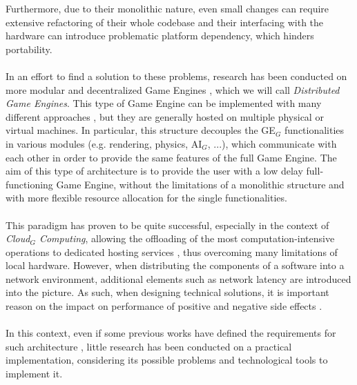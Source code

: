 Furthermore, due to their monolithic nature, even small changes can require extensive refactoring of their whole codebase and their interfacing with the hardware can introduce problematic platform dependency, which hinders portability. \\ \\
In an effort to find a solution to these problems, research has been conducted on more modular and decentralized Game Engines \cite{womak:distributed-architecture-interactive-multiplayer, womak:distributed-cloud-gaming-pipeline, womak:distributed-game-engine-android}, which we will call \textit{Distributed Game Engines}. This type of Game Engine can be implemented with many different approaches \cite{womak:revamping-cloud-games, womak:distributed-cloud-gaming-pipeline, womak:distributed-game-engine-android}, but they are generally hosted on multiple physical or virtual machines. In particular, this structure decouples the GE$_G$ functionalities in various modules (e.g. rendering, physics, AI$_G$, ...), which communicate with each other in order to provide the same features of the full Game Engine. The aim of this type of architecture is to provide the user with a low delay full-functioning Game Engine, without the limitations of a monolithic structure and with more flexible resource allocation for the single functionalities. \\ \\
This paradigm has proven to be quite successful, especially in the context of \textit{Cloud$_G$ Computing}, allowing the offloading of the most computation-intensive operations to dedicated hosting services \cite{womak:revamping-cloud-games, womak:distributed-cloud-gaming-pipeline}, thus overcoming many limitations of local hardware. However, when distributing the components of a software into a network environment, additional elements such as network latency are introduced into the picture. As such, when designing technical solutions, it is important reason on the impact on performance of positive and negative side effects \cite{womak:performance-analysis-game-engine}. \\ \\
In this context, even if some previous works have defined the requirements for such architecture \cite{womak:revamping-cloud-games, womak:game-engines-serious-game}, little research has been conducted on a practical implementation, considering its possible problems and technological tools to implement it.

